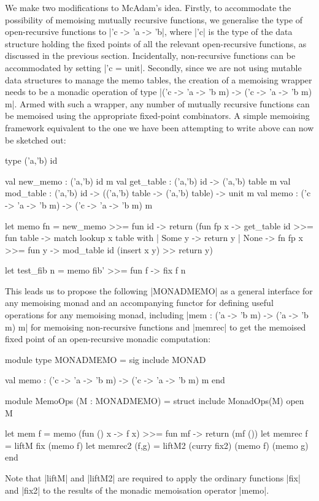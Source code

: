 We make two modifications to McAdam's idea. Firstly,
to accommodate the possibility of memoising mutually recursive functions, we
generalise the type of open-recursive functions to |'c -> 'a -> 'b|, where
|'c| is the type of the data structure holding the fixed points of all
the relevant open-recursive functions, as discussed in the previous section.
Incidentally, non-recursive functions can be accommodated by setting
|'c = unit|. 
Secondly, since we are not using mutable data structures to manage the memo tables,
the creation of a memoising wrapper needs to be a monadic operation of type
|('c -> 'a -> 'b m) -> ('c -> 'a -> 'b m) m|.
Armed with such a wrapper, any number of mutually recursive functions
can be memoised using the appropriate fixed-point combinators. A simple
memoising framework equivalent to the one we have been attempting to write
above can now be sketched out:
\vspace{0.75em}
\begin{badocaml}
	type ('a,'b) id

	val new_memo : ('a,'b) id m
	val get_table : ('a,'b) id -> ('a,'b) table m
	val mod_table : ('a,'b) id -> (('a,'b) table -> ('a,'b) table) -> unit m
	val memo : ('c -> 'a -> 'b m) -> ('c -> 'a -> 'b m) m

	let memo fn = 
		new_memo >>= fun id ->
		return (fun fp x -> 
			get_table id >>= fun table ->
			match lookup x table with
			| Some y -> return y
			| None -> fn fp x >>= fun y ->
								mod_table id (insert x y) >>
								return y) 

	let test_fib n = memo fib' >>= fun f -> fix f n
\end{badocaml}
\vspace{0.75em}
This leads us to propose the following |MONADMEMO| as a general interface for any memoising monad and
an accompanying functor for defining useful operations for any memoising monad, including |mem : ('a -> 'b m) -> ('a -> 'b m) m|
for memoising non-recursive functions and |memrec| to get the memoised%
fixed point of an open-recursive monadic computation:
\vspace{0.75em}
\begin{ocaml}
	module type MONADMEMO = sig
		include MONAD

		val memo : ('c -> 'a -> 'b m) -> ('c -> 'a -> 'b m) m
	end

	module MemoOps (M : MONADMEMO) = struct
		include MonadOps(M)
		open M

		let mem f = memo (fun () x -> f x) >>= fun mf -> return (mf ())
		let memrec f = liftM fix (memo f)
		let memrec2 (f,g) = liftM2 (curry fix2) (memo f) (memo g)
	end
\end{ocaml}
Note that |liftM| and |liftM2| are required to apply the ordinary functions |fix| and
|fix2| to the results of the monadic memoisation operator |memo|.

